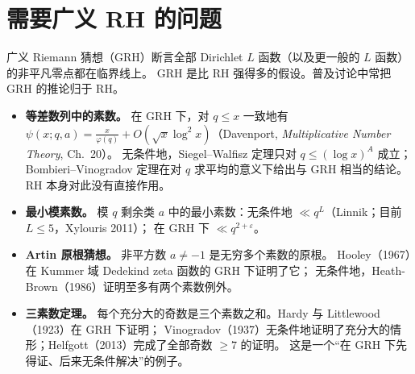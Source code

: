 \documentclass[11pt]{article}
\begin{document}
\section{需要广义 RH 的问题}
广义 Riemann 猜想（GRH）断言全部 Dirichlet $L$ 函数（以及更一般的 $L$ 函数）的非平凡零点都在临界线上。
GRH 是比 RH 强得多的假设。普及讨论中常把 GRH 的推论归于 RH。
\begin{itemize}
 \item \textbf{等差数列中的素数。} 在 GRH 下，对 $q\le x$ 一致地有
 $\psi(x;q,a)=\frac{x}{\varphi(q)}+O(\sqrt x\log^2x)$（Davenport, \emph{Multiplicative Number Theory}, Ch.~20）。
 无条件地，Siegel--Walfisz 定理只对 $q\le(\log x)^A$ 成立；Bombieri--Vinogradov 定理在对 $q$ 求平均的意义下给出与 GRH 相当的结论。
 RH 本身对此没有直接作用。
 \item \textbf{最小模素数。} 模 $q$ 剩余类 $a$ 中的最小素数：无条件地 $\ll q^L$（Linnik；目前 $L\le5$，Xylouris 2011）；
 在 GRH 下 $\ll q^{2+\varepsilon}$。
 \item \textbf{Artin 原根猜想。} 非平方数 $a\ne-1$ 是无穷多个素数的原根。
 Hooley（1967）在 Kummer 域 Dedekind zeta 函数的 GRH 下证明了它；
 无条件地，Heath-Brown（1986）证明至多有两个素数例外。
 \item \textbf{三素数定理。} 每个充分大的奇数是三个素数之和。Hardy 与 Littlewood（1923）在 GRH 下证明；
 Vinogradov（1937）无条件地证明了充分大的情形；Helfgott（2013）完成了全部奇数 $\ge7$ 的证明。
 这是一个“在 GRH 下先得证、后来无条件解决”的例子。
\end{itemize}
\end{document}
